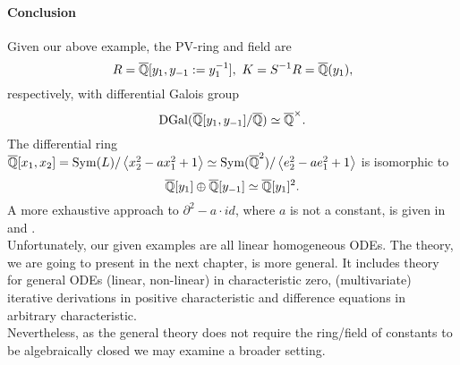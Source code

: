 \paragraph{Conclusion}
Given our above example, the PV-ring and field are
$$R = \overline{\mathbb{Q}}[y_1,y_{-1} := y_1^{-1}],\ K = S^{-1}R = \overline{\mathbb{Q}}(y_1),$$
respectively, with differential Galois group
$$\mathrm{DGal}(\overline{\mathbb{Q}}[y_1,y_{-1}]/\overline{\mathbb{Q}}) \simeq \overline{\mathbb{Q}}^\times.$$
The differential ring $\overline{\mathbb{Q}}[x_1,x_2] = \mathrm{Sym}(L)/\left<x_2^2 - a x_1^2 + 1\right> \simeq \mathrm{Sym}(\overline{\mathbb{Q}}^2)/\left<e_2^2 - a e_1^2 + 1\right>$ is isomorphic to
$$\overline{\mathbb{Q}}[y_1] \oplus \overline{\mathbb{Q}}[y_{-1}] \simeq \overline{\mathbb{Q}}[y_1]^2.$$
\bmk %
A more exhaustive approach to $\partial^2 - a \cdot id$, where $a$ is not a constant, is given in \cite{vdPS01} and \cite{CohCuySte}.\\
\indent Unfortunately, our given examples are all linear homogeneous ODEs. The theory, we are going to present in the next chapter, is more general. It includes theory for general ODEs (linear, non-linear) in characteristic zero, (multivariate) iterative derivations in positive characteristic and difference equations in arbitrary characteristic.\\
\indent Nevertheless, as the general theory does not require the ring/field of constants to be algebraically closed we may examine a broader setting.
